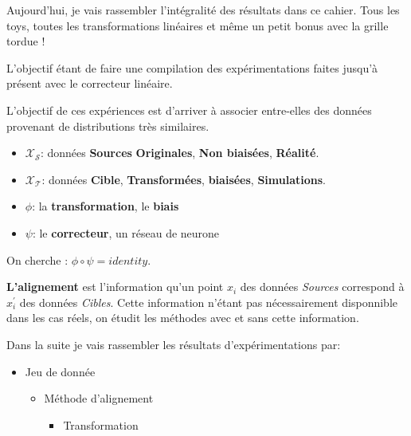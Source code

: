 
\label{day:24-05-2016}

Aujourd'hui, je vais rassembler l'intégralité des résultats dans ce cahier.
Tous les toys, toutes les transformations linéaires et même un petit bonus avec
la grille tordue !

L'objectif étant de faire une compilation des expérimentations faites jusqu'à présent
avec le correcteur linéaire.


L'objectif de ces expériences est d'arriver à associer entre-elles des données
provenant de distributions très similaires.

\begin{itemize}
	\item $\mathcal{X_S}$: données \textbf{Sources} \textbf{Originales}, \textbf{Non biaisées}, \textbf{Réalité}.
	\item $\mathcal{X_T}$: données \textbf{Cible}, \textbf{Transformées}, \textbf{biaisées}, \textbf{Simulations}.
	\item $\phi$: la \textbf{transformation}, le \textbf{biais}
	\item $\psi$: le \textbf{correcteur}, un réseau de neurone
\end{itemize}
On cherche : $\phi \circ \psi = identity$.

\textbf{L'alignement} est l'information qu'un point $x_i$ des données \emph{Sources} correspond 
à $x_i^\prime$ des données \emph{Cibles}. Cette information n'étant pas nécessairement 
disponnible dans les cas réels, on étudit les méthodes avec et sans cette information. 


Dans la suite je vais rassembler les résultats d'expérimentations par:
\begin{itemize}
	\item Jeu de donnée
	\begin{itemize}
		\item Méthode d'alignement
		\begin{itemize}
			\item Transformation
		\end{itemize}
	\end{itemize}
\end{itemize}



